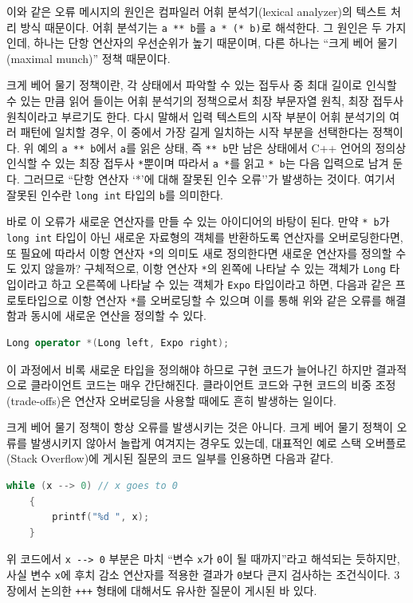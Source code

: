 \documentclass[titlepage]{pnureport}
\begin{document}
이와 같은 오류 메시지의 원인은 컴파일러 어휘 분석기(lexical analyzer)의 텍스트 처리 방식 때문이다. 어휘 분석기는 \texttt{a ** b}를 \texttt{a * (* b)}로 해석한다. 그 원인은 두 가지인데, 하나는 단항 연산자의 우선순위가 높기 때문이며, 다른 하나는 ``크게 베어 물기(maximal munch)'' 정책\cite{cattell78} 때문이다. 

크게 베어 물기 정책이란, 각 상태에서 파악할 수 있는 접두사 중 최대 길이로 인식할 수 있는 만큼 읽어 들이는 어휘 분석기의 정책으로서 최장 부문자열 원칙\cite{louden97}, 최장 접두사\cite{alu07} 원칙이라고 부르기도 한다. 다시 말해서 입력 텍스트의 시작 부분이 어휘 분석기의 여러 패턴에 일치할 경우, 이 중에서 가장 길게 일치하는 시작 부분을 선택한다는 정책이다. 위 예의 \texttt{a ** b}에서 \texttt{a}를 읽은 상태, 즉 \texttt{** b}만 남은 상태에서 C++ 언어의 정의상 인식할 수 있는 최장 접두사 \texttt{*}뿐이며 따라서 \texttt{a *}를 읽고 \texttt{* b}는 다음 입력으로 남겨 둔다. 그러므로 ``단항 연산자 `*'에 대해 잘못된 인수 오류''가 발생하는 것이다. 여기서 잘못된 인수란 \texttt{long int} 타입의 \texttt{b}를 의미한다.

바로 이 오류가 새로운 연산자를 만들 수 있는 아이디어의 바탕이 된다. 만약 \texttt{* b}가 \texttt{long int} 타입이 아닌 새로운 자료형의 객체를 반환하도록 연산자를 오버로딩한다면, 또 필요에 따라서 이항 연산자 \texttt{*}의 의미도 새로 정의한다면 새로운 연산자를 정의할 수도 있지 않을까? 구체적으로, 이항 연산자 \texttt{*}의 왼쪽에 나타날 수 있는 객체가 \texttt{Long} 타입이라고 하고 오른쪽에 나타날 수 있는 객체가 \texttt{Expo} 타입이라고 하면, 다음과 같은 프로토타입으로 이항 연산자 \texttt{*}를 오버로딩할 수 있으며 이를 통해 위와 같은 오류를 해결함과 동시에 새로운 연산을 정의할 수 있다.
\begin{lstlisting}[language=c++,frame=none,numbers=none]
Long operator *(Long left, Expo right);
\end{lstlisting}
이 과정에서 비록 새로운 타입을 정의해야 하므로 구현 코드가 늘어나긴 하지만 결과적으로 클라이언트 코드는 매우 간단해진다. 클라이언트 코드와 구현 코드의 비중 조정(trade-offs)은 연산자 오버로딩을 사용할 때에도 흔히 발생하는 일이다.

크게 베어 물기 정책이 항상 오류를 발생시키는 것은 아니다. 크게 베어 물기 정책이 오류를 발생시키지 않아서 놀랍게 여겨지는 경우도 있는데, 대표적인 예로 스택 오버플로(Stack Overflow)에 게시된 질문\cite{user11}의 코드 일부를 인용하면 다음과 같다.
\begin{lstlisting}[language=c++,frame=none,numbers=none]
    while (x --> 0) // x goes to 0
    {
        printf("%d ", x);
    }
\end{lstlisting}
위 코드에서 \verb|x --> 0| 부분은 마치 ``변수 \texttt{x}가 \texttt{0}이 될 때까지''라고 해석되는 듯하지만, 사실 변수 \texttt{x}에 후치 감소 연산자를 적용한 결과가 \texttt{0}보다 큰지 검사하는 조건식이다. 3장에서 논의한 \texttt{+++} 형태에 대해서도 유사한 질문\cite{user13}이 게시된 바 있다.
\end{document}
